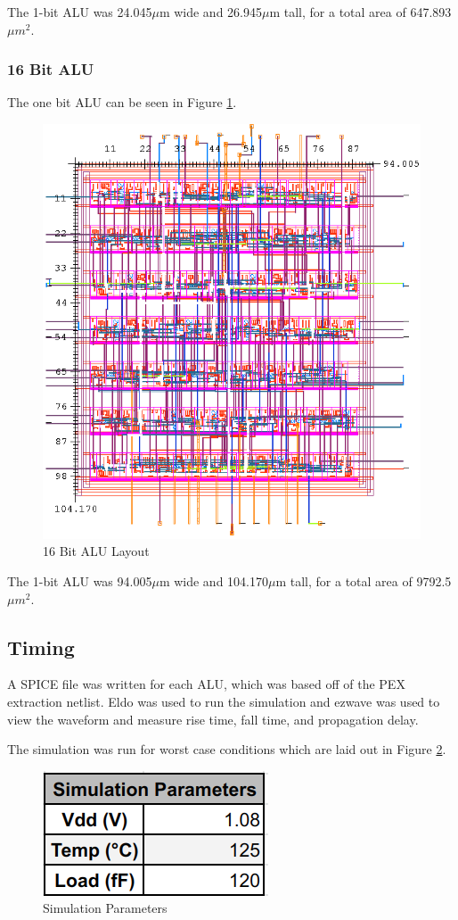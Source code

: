 \documentclass[11pt]{article}
\begin{document}
			The 1-bit ALU was 24.045$\mu$m wide and 26.945$\mu$m tall, for a total area of 647.893$\mu m^2$.
	
		\subsubsection{16 Bit ALU}
		
			The one bit ALU can be seen in Figure \ref{fig:alu-16bit-layout}.
		
			\begin{figure}[H]
				\centering
				\includegraphics[width=0.7\linewidth]{"Pictures/ALU 16-Bit Layout"}
				\caption{16 Bit ALU Layout}
				\label{fig:alu-16bit-layout}
			\end{figure}
		
			The 1-bit ALU was 94.005$\mu$m wide and 104.170$\mu$m tall, for a total area of 9792.5$\mu m^2$.

	
	\subsection{Timing}
	
		A SPICE file was written for each ALU, which was based off of the PEX extraction netlist. Eldo was used to run the simulation and ezwave was used to view the waveform and measure rise time, fall time, and propagation delay.
		
		The simulation was run for worst case conditions which are laid out in Figure \ref{fig:simulation-parameters}. 
		
		\begin{figure}[H]
			\centering
			\includegraphics[width=0.4\linewidth]{"Pictures/Simulation Parameters"}
			\caption{Simulation Parameters}
			\label{fig:simulation-parameters}
		\end{figure}
		
\end{document}
